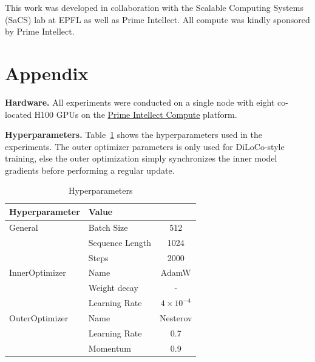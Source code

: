 \documentclass{article}
\begin{document}
This work was developed in collaboration with the Scalable Computing Systems
(SaCS) lab at EPFL as well as Prime Intellect. All compute was kindly sponsored
by Prime Intellect.




\newpage
\appendix
\onecolumn

\section{Appendix}

\textbf{Hardware.} All experiments were conducted on a single node with eight
co-located H100 GPUs on the \href{https://app.primeintellect.com/}{Prime
Intellect Compute} platform.

\textbf{Hyperparameters.} Table~\ref{tab:hyperparameters} shows the
hyperparameters used in the experiments. The outer optimizer parameters is only
used for DiLoCo-style training, else the outer optimization simply synchronizes
the inner model gradients before performing a regular update.

\begin{table}[ht]
\centering
\begin{tabular}{llc}
\toprule
\textbf{Hyperparameter} & \textbf{Value} \\ 
\midrule
\multirow{1}{*}{General} & Batch Size & 512 \\ 
& Sequence Length & 1024 \\ 
& Steps & 2000 \\
\hline
\multirow{1}{*}{InnerOptimizer} & Name & AdamW \\ 
& Weight decay & - \\ 
& Learning Rate & $4 \times 10^{-4}$ \\ 
\hline
\multirow{1}{*}{OuterOptimizer} & Name & Nesterov \\ 
& Learning Rate & 0.7 \\ 
& Momentum & 0.9 \\ 
\bottomrule
\end{tabular}
\caption{Hyperparameters}
\label{tab:hyperparameters}
\end{table}
\end{document}
